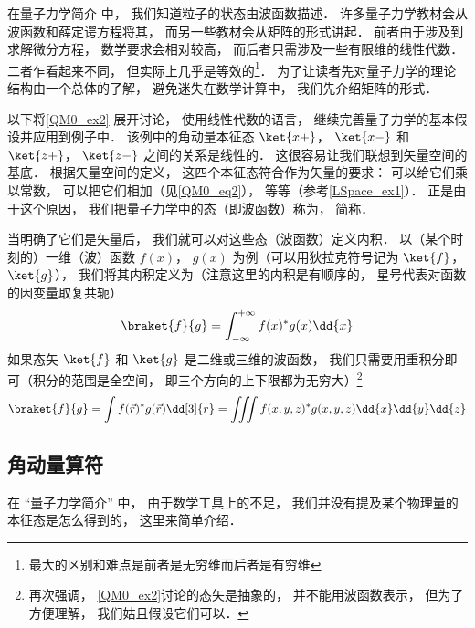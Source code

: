 

在量子力学简介 中， 我们知道粒子的状态由波函数描述． 许多量子力学教材会从波函数和薛定谔方程将其， 而另一些教材会从矩阵的形式讲起． 前者由于涉及到求解微分方程， 数学要求会相对较高， 而后者只需涉及一些有限维的线性代数． 二者乍看起来不同， 但实际上几乎是等效的\footnote{最大的区别和难点是前者是无穷维而后者是有穷维}． 为了让读者先对量子力学的理论结构由一个总体的了解， 避免迷失在数学计算中， 我们先介绍矩阵的形式．

以下将\autoref{QM0_ex2} 展开讨论， 使用线性代数的语言， 继续完善量子力学的基本假设并应用到例子中． 该例中的角动量本征态 $\ket{x+}$， $\ket{x-}$ 和 $\ket{z+}$， $\ket{z-}$ 之间的关系是线性的． 这很容易让我们联想到矢量空间的基底． 根据矢量空间的定义， 这四个本征态符合作为矢量的要求： 可以给它们乘以常数， 可以把它们相加（见\autoref{QM0_eq2}）， 等等（参考\autoref{LSpace_ex1}）． 正是由于这个原因， 我们把量子力学中的态（即波函数）称为， 简称．

当明确了它们是矢量后， 我们就可以对这些态（波函数）定义内积． 以（某个时刻的）一维（波）函数 $f(x)$， $g(x)$ 为例（可以用狄拉克符号记为 $\ket{f}$， $\ket{g}$）， 我们将其内积定义为（注意这里的内积是有顺序的， 星号代表对函数的因变量取复共轭）%
\begin{equation}
\braket{f}{g} = \int_{-\infty}^{+\infty} f(x)^* g(x) \dd{x}
\end{equation}
如果态矢 $\ket{f}$ 和 $\ket{g}$ 是二维或三维的波函数， 我们只需要用重积分即可（积分的范围是全空间， 即三个方向的上下限都为无穷大）\footnote{再次强调， \autoref{QM0_ex2}讨论的态矢是抽象的， 并不能用波函数表示， 但为了方便理解， 我们姑且假设它们可以．}
\begin{equation}
\braket{f}{g} = \int f(\vec r)^* g(\vec r) \dd[3]{r} = \iiint f(x, y, z)^* g(x, y, z) \dd{x}\dd{y}\dd{z}
\end{equation}


\subsection{角动量算符}
在 “量子力学简介” 中， 由于数学工具上的不足， 我们并没有提及某个物理量的本征态是怎么得到的， 这里来简单介绍．

